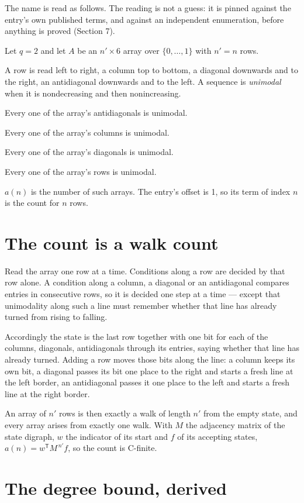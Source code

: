 \documentclass[11pt]{article}
\theoremstyle{definition}
\begin{document}
The name is read as follows. The reading is not a guess: it is pinned against the entry's own published terms, and against an independent enumeration, before anything is proved (Section 7).

Let $q = 2$ and let $A$ be an $n' \times 6$ array over $\{0,\dots,1\}$ with $n' = n$ rows.

A row is read left to right, a column top to bottom, a diagonal downwards and to the right, an antidiagonal downwards and to the left. A sequence is {\itshape unimodal} when it is nondecreasing and then nonincreasing.

Every one of the array's antidiagonals is unimodal.

Every one of the array's columns is unimodal.

Every one of the array's diagonals is unimodal.

Every one of the array's rows is unimodal.

$a(n)$ is the number of such arrays. The entry's offset is 1, so its term of index $n$ is the count for $n$ rows.

\section{The count is a walk count}

Read the array one row at a time. Conditions along a row are decided by that row alone. A condition along a column, a diagonal or an antidiagonal compares entries in consecutive rows, so it is decided one step at a time --- except that unimodality along such a line must remember whether that line has already turned from rising to falling.

Accordingly the state is the last row together with one bit for each of the columns, diagonals, antidiagonals through its entries, saying whether that line has already turned. Adding a row moves those bits along the line: a column keeps its own bit, a diagonal passes its bit one place to the right and starts a fresh line at the left border, an antidiagonal passes it one place to the left and starts a fresh line at the right border.

An array of $n'$ rows is then exactly a walk of length $n'$ from the empty state, and every array arises from exactly one walk. With $M$ the adjacency matrix of the state digraph, $w$ the indicator of its start and $f$ of its accepting states, $a(n) = w^{\mathsf T}M^{\,n'}f$, so the count is C-finite.

\section{The degree bound, derived}
\end{document}
